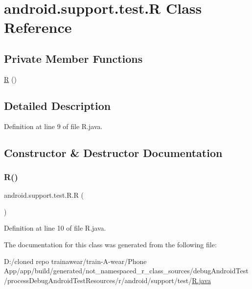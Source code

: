 \hypertarget{classandroid_1_1support_1_1test_1_1_r}{}\section{android.\+support.\+test.\+R Class Reference}
\label{classandroid_1_1support_1_1test_1_1_r}
\subsection*{Private Member Functions}
\begin{DoxyCompactItemize}
\item 
\mbox{\hyperlink{classandroid_1_1support_1_1test_1_1_r_ad5bb4c02fd141e5eb480be8e21d0778c}{R}} ()
\end{DoxyCompactItemize}


\subsection{Detailed Description}


Definition at line 9 of file R.\+java.



\subsection{Constructor \& Destructor Documentation}
\mbox{\label{classandroid_1_1support_1_1test_1_1_r_ad5bb4c02fd141e5eb480be8e21d0778c}} 
\subsubsection{\texorpdfstring{R()}{R()}}
{\footnotesize\ttfamily android.\+support.\+test.\+R.\+R (\begin{DoxyParamCaption}{ }\end{DoxyParamCaption})\hspace{0.3cm}{\ttfamily [private]}}



Definition at line 10 of file R.\+java.


\begin{DoxyCode}{0}

\end{DoxyCode}


The documentation for this class was generated from the following file\+:\begin{DoxyCompactItemize}
\item 
D\+:/cloned repo trainawear/train-\/\+A-\/wear/\+Phone App/app/build/generated/not\+\_\+namespaced\+\_\+r\+\_\+class\+\_\+sources/debug\+Android\+Test/process\+Debug\+Android\+Test\+Resources/r/android/support/test/\mbox{\hyperlink{ndroid_test_2process_debug_android_test_resources_2r_2android_2support_2test_2_r_8java}{R.\+java}}\end{DoxyCompactItemize}
